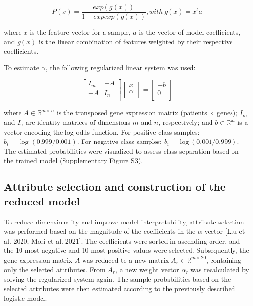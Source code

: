 \begin{equation}
  P(x) = \frac{exp(g(x))}{1 + exp exp(g(x))}, with\ g(x) = x^t a
\end{equation}

where $x$ is the feature vector for a sample, $a$ is the vector of model coefficients, and $g(x)$ is the linear combination of features weighted by their respective coefficients.

To estimate $\alpha$, the following regularized linear system was used:

\begin{equation}
  \begin{bmatrix}
    I_m & -A  \\
    -A  & I_n \\
  \end{bmatrix}
  \begin{bmatrix}
    x      \\
    \alpha \\
  \end{bmatrix}
  =
  \begin{bmatrix}
    -b \\
    0  \\
  \end{bmatrix}
\end{equation}

where $A \in \mathbb{R}^{m \times n}$ is the transposed gene expression matrix (patients $\times$ genes); $I_m$ and $I_n$ are identity matrices of dimensions $m$ and $n$, respectively; and $b \in \mathbb{R}^m$ is a vector encoding the log-odds function. For positive class samples: $b_i = \log(0.999/0.001)$. For negative class samples: $b_i = \log(0.001/0.999)$. The estimated probabilities were visualized to assess class separation based on the trained model (Supplementary Figure S3).

\subsection{Attribute selection and construction of the reduced model}

To reduce dimensionality and improve model interpretability, attribute selection was performed based on the magnitude of the coefficients in the $\alpha$ vector [Liu et al. 2020; Mori et al. 2021]. The coefficients were sorted in ascending order, and the 10 most negative and 10 most positive values were selected. Subsequently, the gene expression matrix $A$ was reduced to a new matrix $A_r \in \mathbb{R}^{m \times 20}$, containing only the selected attributes. From $A_r$, a new weight vector $\alpha_r$ was recalculated by solving the regularized system again. The sample probabilities based on the selected attributes were then estimated according to the previously described logistic model.

